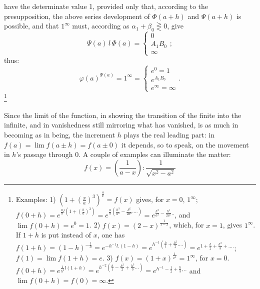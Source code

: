 \documentclass[12pt,a4paper,openany]{book}
\newcommand{\opage}[1]{\marginnote{\footnotesize\textit{[#1]}}}
\begin{document}
\setcounter{footnote}{0}%
\opage{74}have the determinate value 1, provided only that, according to the presupposition, the above series development of $\Phi(a+h)$ and $\Psi(a+h)$ is possible, and that $1^{\infty}$ must, according as $\alpha_{1}+\beta_{0}\gtreqless 0$, give
\[ \Psi(a)\,l\,\Phi(a)=\begin{cases}0\\ A_{1}B_{0}\\ \infty\end{cases} ; \]
thus:
\[ \varphi(a)^{\Psi(a)}=1^{\infty}=\begin{cases}e^{0}=1\\ e^{A_{1}B_{0}}\\ e^{\infty}=\infty\end{cases}. \]\footnote[1]{Examples: 1) $\left(1+\left(\frac{x}{a}\right)^{3}\right)^{\frac{a}{x}}=f(x)$ gives, for $x=0$, $1^{\infty}$; $f(0+h)=e^{\frac{a}{h}l(1+(\frac{h}{a})^{3})}=e^{\frac{a}{h}(\frac{h^{3}}{a^{3}}-\frac{h^{6}}{2a^{6}}....)}=e^{\frac{h^{2}}{a^{2}}-\frac{h^{5}}{2a^{5}}..}$, and $\lim f(0+h)=e^{0}=1$. 2) $f(x)=(2-x)^{\frac{1}{1-x}}$, which, for $x=1$, gives $1^{\infty}$. If $1+h$ is put instead of $x$, one has $f(1+h)=(1-h)^{-\frac{1}{h}}=e^{-h^{-1}l.(1-h)}=e^{h^{-1}(\frac{h}{1}+\frac{h^{2}}{2}....)}=e^{1+\frac{h}{2}+\frac{h^{2}}{3}+....}$; $f(1)=\lim f(1+h)=e$. 3) $f(x)=(1+x)^{\frac{1}{x^{2}}}=1^{\infty}$, for $x=0$. $f(0+h)=e^{\frac{1}{h^{2}}l(1+h)}=e^{h^{-2}(\frac{h}{1}-\frac{h^{2}}{2}+\frac{h^{3}}{3}...)}=e^{h^{-1}-\frac{1}{2}+\frac{h}{3},..}$ and $\lim f(0+h)=f(0)=\infty$.}


\setcounter{footnote}{0}%
\opage{75}Since the limit of the function, in showing the transition of the finite into the infinite, and in vanishedness still mirroring what has vanished, is as much in becoming as in being, the increment $h$ plays the real leading part: in $f(a)=\lim f(a\pm h)=f(a\pm 0)$ it depends, so to speak, on the movement in $h$'s passage through $0$. A couple of
examples can illuminate the matter:
\[ f(x)=\left(\frac{1}{a-x}\right):\frac{1}{\sqrt{x^{2}-a^{2}}} \]
\end{document}
